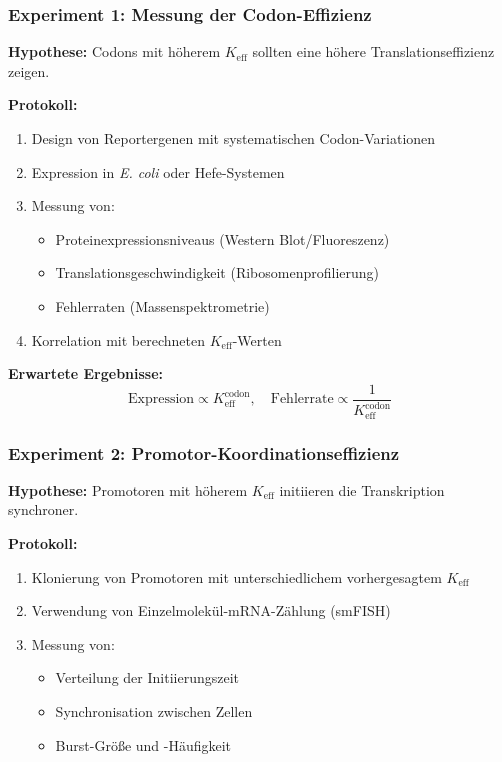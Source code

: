 \documentclass[12pt]{article}
\begin{document}
	\subsubsection{Experiment 1: Messung der Codon-Effizienz}
	\textbf{Hypothese:} Codons mit höherem $K_{\text{eff}}$ sollten eine höhere Translationseffizienz zeigen.
	
	\textbf{Protokoll:}
	\begin{enumerate}
		\item Design von Reportergenen mit systematischen Codon-Variationen
		\item Expression in \textit{E. coli} oder Hefe-Systemen
		\item Messung von:
		\begin{itemize}
			\item Proteinexpressionsniveaus (Western Blot/Fluoreszenz)
			\item Translationsgeschwindigkeit (Ribosomenprofilierung)
			\item Fehlerraten (Massenspektrometrie)
		\end{itemize}
		\item Korrelation mit berechneten $K_{\text{eff}}$-Werten
	\end{enumerate}
	
	\textbf{Erwartete Ergebnisse:}
	\[
	\text{Expression} \propto K_{\text{eff}}^{\text{codon}}, \quad \text{Fehlerrate} \propto \frac{1}{K_{\text{eff}}^{\text{codon}}}
	\]
	
	\subsubsection{Experiment 2: Promotor-Koordinationseffizienz}
	\textbf{Hypothese:} Promotoren mit höherem $K_{\text{eff}}$ initiieren die Transkription synchroner.
	
	\textbf{Protokoll:}
	\begin{enumerate}
		\item Klonierung von Promotoren mit unterschiedlichem vorhergesagtem $K_{\text{eff}}$
		\item Verwendung von Einzelmolekül-mRNA-Zählung (smFISH)
		\item Messung von:
		\begin{itemize}
			\item Verteilung der Initiierungszeit
			\item Synchronisation zwischen Zellen
			\item Burst-Größe und -Häufigkeit
		\end{itemize}
	\end{enumerate}
	
\end{document}
